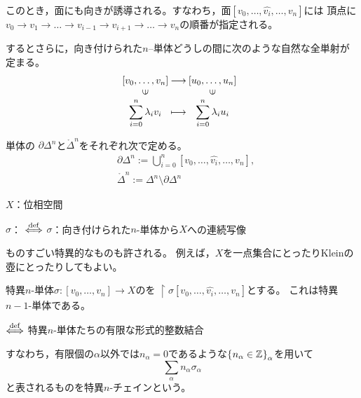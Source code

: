 \documentclass[uplatex]{jsarticle}
\begin{document}
このとき，面にも向きが誘導される。すなわち，面$[v_{0}, \dots, \hat{v_{i}}, \dots, v_{n}]$には
頂点に$v_{0} \to v_{1} \to \dots \to v_{i-1} \to v_{i+1} \to \dots \to v_{n}$の順番が指定される。

するとさらに，向き付けられた$n$--単体どうしの間に次のような自然な全単射が定まる。
\begin{equation}
  \mapdef{[v_{0}, \dots, v_{n}]}{[u_{0}, \dots, u_{n}]}{\displaystyle \sum_{i=0}^{n} \lambda_{i} v_{i}}{\displaystyle \sum_{i=0}^{n} \lambda_{i} u_{i}}
\end{equation}

\begin{teigi}[境界，内部]
  単体の $\partial \Delta^{n}$と$\mathring{\Delta}^{n}$をそれぞれ次で定める。
  \begin{align}
    & \partial \Delta^{n} := \bigcup_{i=0}^{n} [v_{0}, \dots, \hat{v_{i}}, \dots, v_{n}], \\
    & \mathring{\Delta}^{n} := \Delta^{n} \setminus \partial \Delta^{n}
  \end{align}
\end{teigi}

\sukima {}

$X$：位相空間

\begin{teigi}[特異$n$-単体]
  $\sigma$： $\overset{\mathrm{def}}{\Longleftrightarrow}$ $\sigma$：向き付けられた$n$-単体から$X$への連続写像
\end{teigi}

ものすごい特異的なものも許される。
例えば，$X$を一点集合にとったりKleinの壺にとったりしてもよい。

\begin{teigi}
  特異$n$-単体$\sigma \colon [v_{0}, \dots, v_{n}] \longrightarrow X$のを
  $\restriction{\sigma}{[v_{0}, \dots,\hat{v_{i}}, \dots, v_{n}]}$とする。
  これは特異$n-1$-単体である。
\end{teigi}

\begin{teigi}[特異$n$-チェイン]
   $\overset{\mathrm{def}}{\Longleftrightarrow}$ 特異$n$-単体たちの有限な形式的整数結合
\end{teigi}

すなわち，有限個の$\alpha$以外では$n_{\alpha}=0$であるような$\Set{\hspace{-1.8pt} n_{\alpha} \in \mathbb{Z} \hspace{-1.8pt}}_{\alpha}$を用いて
\begin{equation}
  \sum_{\alpha} n_{\alpha} \sigma_{\alpha}
\end{equation}
と表されるものを特異$n$-チェインという。
\end{document}
